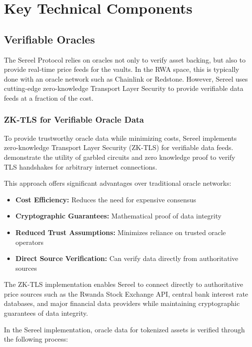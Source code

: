 \documentclass[12pt]{article}
\begin{document}
\section{Key Technical Components}

\subsection{Verifiable Oracles}
The Sereel Protocol relies on oracles not only to verify asset backing, but also to provide real-time price feeds for the vaults. In the RWA space, this is typically done with an oracle network such as Chainlink or Redstone. However, Sereel uses cutting-edge zero-knowledge Transport Layer Security to provide verifiable data feeds at a fraction of the cost. 

\subsubsection{ZK-TLS for Verifiable Oracle Data}
To provide trustworthy oracle data while minimizing costs, Sereel implements zero-knowledge Transport Layer Security (ZK-TLS) for verifiable data feeds. \cite{xie2023zktls} demonstrate the utility of garbled circuits and zero knowledge proof to verify TLS handshakes for arbitrary internet connections.

This approach offers significant advantages over traditional oracle networks:

\begin{itemize}
  \item \textbf{Cost Efficiency:} Reduces the need for expensive consensus
  \item \textbf{Cryptographic Guarantees:} Mathematical proof of data integrity
  \item \textbf{Reduced Trust Assumptions:} Minimizes reliance on trusted oracle operators
  \item \textbf{Direct Source Verification:} Can verify data directly from authoritative sources
\end{itemize}

The ZK-TLS implementation enables Sereel to connect directly to authoritative price sources such as the Rwanda Stock Exchange API, central bank interest rate databases, and major financial data providers while maintaining cryptographic guarantees of data integrity.

In the Sereel implementation, oracle data for tokenized assets is verified through the following process:
\end{document}
